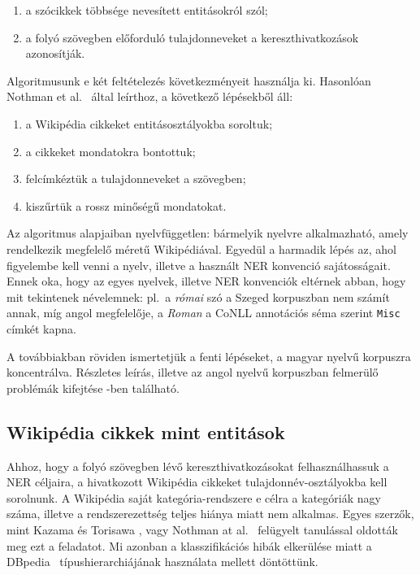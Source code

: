 \documentclass{llncs}
\begin{document}
\begin{enumerate}
\item a szócikkek többsége nevesített entitásokról szól;
\item a folyó szövegben előforduló tulajdonneveket a kereszthivatkozások
      azonosítják.
\end{enumerate}

Algoritmusunk e két feltételezés következményeit használja ki. Hasonlóan Nothman
et al.~\cite{Nothman:08} által leírthoz, a következő lépésekből áll:

\begin{enumerate}
\item a Wikipédia cikkeket entitásosztályokba soroltuk;
\item a cikkeket mondatokra bontottuk;
\item felcímkéztük a tulajdonneveket a szövegben;
\item kiszűrtük a rossz minőségű mondatokat.
\end{enumerate}

Az algoritmus alapjaiban nyelvfüggetlen: bármelyik nyelvre alkalmazható, amely
rendelkezik megfelelő méretű Wikipédiával. Egyedül a harmadik lépés az, ahol
figyelembe kell venni a nyelv, illetve a használt NER konvenció sajátosságait.
Ennek oka, hogy az egyes nyelvek, illetve NER konvenciók eltérnek abban, hogy
mit tekintenek névelemnek: pl.~a \textit{római} szó a Szeged korpuszban nem
számít annak, míg angol megfelelője, a \textit{Roman} a CoNLL annotációs séma
szerint \texttt{Misc} címkét kapna.

A továbbiakban röviden ismertetjük a fenti lépéseket, a magyar nyelvű korpuszra
koncentrálva. Részletes leírás, illetve az angol nyelvű korpuszban felmerülő
problémák kifejtése \cite{simon-nemeskey:2012:NEWS2012}-ben található.

\subsection{Wikipédia cikkek mint entitások}
\label{corpusbuilding:entities}

Ahhoz, hogy a folyó szövegben lévő kereszthivatkozásokat felhasználhassuk a
NER céljaira, a hivatkozott Wikipédia cikkeket tulajdonnév-osztályokba kell
sorolnunk. A Wikipédia saját kategória-rendszere e célra a kategóriák nagy
száma, illetve a rendszerezettség teljes hiánya miatt nem alkalmas. Egyes
szerzők, mint Kazama és Torisawa \cite{KaTo07}, vagy Nothman at
al.~\cite{Nothman:08} felügyelt tanulással oldották meg ezt a feladatot. Mi
azonban a klasszifikációs hibák elkerülése miatt a DBpedia~\cite{Bizer:09}
típushierarchiájának használata mellett döntöttünk.
\end{document}
